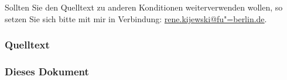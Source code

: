 \documentclass[10pt,a4paper,ngerman,titlepage,tocindentauto]{scrartcl}
\begin{document}
			Sollten Sie den Quelltext zu anderen Konditionen weiterverwenden wollen, so setzen Sie
			sich bitte mit mir in Verbindung:
			\href{mailto:rene.kijewski@fu-berlin.de?subject=[SWP_CP_2010]}{rene.kijewski@fu"=berlin.de}.
			
			\subsubsection{Quelltext}
				\begin{multicols}{3}
					{\tiny}
				\end{multicols}
			
			\subsubsection[Dieses Dokument]{Dieses Dokument}
				\begin{multicols}{3}
					{\tiny}
				\end{multicols}
\end{document}
